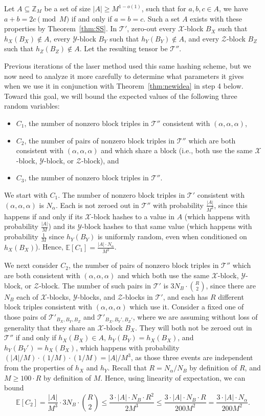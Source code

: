 \documentclass{theoretics}
\newcommand{\E}{\mathbb{E}}
\newcommand{\T}{\mathcal{T}}
\newcommand{\X}{\mathcal{X}}
\newcommand{\Y}{\mathcal{Y}}
\newcommand{\Z}{\mathcal{Z}}
\begin{document}
Let $A \subseteq \mathbb{Z}_M$ be a set of size $|A| \geq M^{1-o(1)}$, such that for $a,b,c \in A$, we have $a+b=2c \pmod{M}$ if and only if $a=b=c$. Such a set $A$ exists with these properties by Theorem~\ref{thm:SS}. In $\T'$, zero-out every $\X$-block $B_X$ such that $h_X(B_X) \notin A$, every $\Y$-block $B_Y$ such that $h_Y(B_Y) \notin A$, and every $\Z$-block $B_Z$ such that $h_Z(B_Z) \notin A$. Let the resulting tensor be $\T''$. 

Previous iterations of the laser method used this same hashing scheme, but we now need to analyze it more carefully to determine what parameters it gives when we use it in conjunction with Theorem~\ref{thm:newidea} in step 4 below. Toward this goal, we will bound the expected values of the following three random variables:
\begin{itemize}
    \item $C_1$, the number of nonzero block triples in $\T''$ consistent with $(\alpha,\alpha,\alpha)$,
    \item $C_2$, the number of pairs of nonzero block triples in $\T''$ which are both consistent with $(\alpha,\alpha,\alpha)$ and which share a block (i.e., both use the same $\X$-block, $\Y$-block, or $\Z$-block), and
    \item $C_3$, the number of nonzero block triples in $\T''$.
\end{itemize}

We start with $C_1$. The number of nonzero block triples in $\T'$ consistent with $(\alpha,\alpha,\alpha)$ is $N_\alpha$. Each is not zeroed out in $\T''$ with probability $\frac{|A|}{M^2}$, since this happens if and only if its $\X$-block hashes to a value in $A$ (which happens with probability $\frac{|A|}{M}$) and its $\Y$-block hashes to that same value (which happens with probability $\frac{1}{M}$ since $h_Y(B_Y)$ is uniformly random, even when conditioned on $h_X(B_X)$). Hence, $\E[C_1] = \frac{|A| \cdot N_\alpha}{M^2}$.

We next consider $C_2$, the number of pairs of nonzero block triples in $\T''$ which are both consistent with $(\alpha,\alpha,\alpha)$ and which both use the same $\X$-block, $\Y$-block, or $\Z$-block. The number of such pairs in $\T'$ is $3N_B \cdot \binom{R}{2}$, since there are $N_B$ each of $\X$-blocks, $\Y$-blocks, and $\Z$-blocks in $\T'$, and each has $R$ different block triples consistent with $(\alpha,\alpha,\alpha)$ which use it. Consider a fixed one of those pairs of $\T'_{B_X, B_Y, B_Z}$ and $\T'_{B_X, B_Y', B_Z'}$, where we are assuming without loss of generality that they share an $\X$-block $B_X$. They will both not be zeroed out in $\T''$ if and only if $h_X(B_X) \in A$, $h_Y(B_Y) = h_X(B_X)$, and $h_Y(B_Y') = h_X(B_X)$, which happens with probability $(|A|/M) \cdot (1/M) \cdot (1/M) = |A|/M^{3}$, as those three events are independent from the properties of $h_X$ and $h_Y$. Recall that $R = N_\alpha / N_B$ by definition of $R$, and $M \geq 100\cdot R$ by definition of $M$. Hence, using linearity of expectation, we can bound $$\E[C_2] = \frac{|A|}{M^3} \cdot 3 N_B \cdot \binom{R}{2} \leq \frac{3 \cdot |A| \cdot N_B \cdot R^2}{2 M^3} \leq \frac{3 \cdot |A| \cdot N_B \cdot R}{200 M^2} = \frac{3 \cdot |A| \cdot N_\alpha}{200 M^2}.$$
\end{document}
